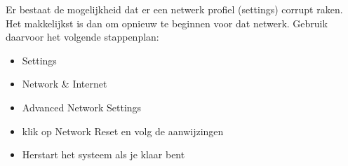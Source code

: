 Er bestaat de mogelijkheid dat er een netwerk profiel (settings) corrupt raken. Het makkelijkst is dan om opnieuw te beginnen voor dat netwerk. Gebruik daarvoor het volgende stappenplan:
\begin{itemize}
\item Settings
\item Network \& Internet
\item Advanced Network Settings
\item klik op Network Reset en volg de aanwijzingen
\item Herstart het systeem als je klaar bent
\end{itemize}

